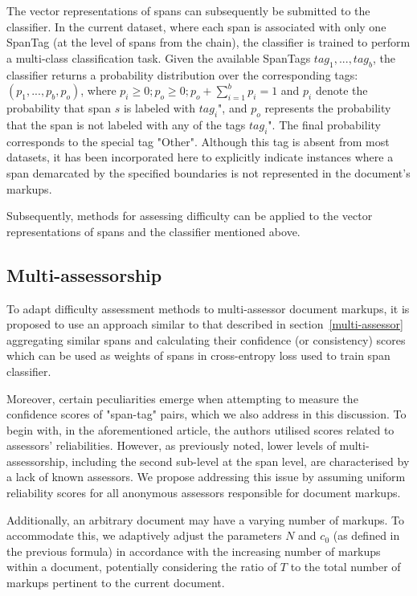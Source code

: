 \documentclass{article}
\begin{document}
The vector representations of spans can subsequently be submitted to the classifier. In the current dataset, where each span is associated with only one SpanTag (at the level of spans from the chain), the classifier is trained to perform a multi-class classification task. Given the available SpanTags $tag_1, ..., tag_b$, the classifier returns a probability distribution over the corresponding tags: $(p_1, ..., p_b, p_{o})$, where $p_i \geq 0; p_o \geq 0; p_o + \sum_{i=1}^bp_i = 1$ and $p_i$ denote the probability that span $s$ is labeled with $tag_i$", and $p_o$ represents the probability that the span is not labeled with any of the tags $tag_i$". The final probability corresponds to the special tag "Other". Although this tag is absent from most datasets, it has been incorporated here to explicitly indicate instances where a span demarcated by the specified boundaries is not represented in the document's markups.

Subsequently, methods for assessing difficulty can be applied to the vector representations of spans and the classifier mentioned above.

\subsection{Multi-assessorship}
To adapt difficulty assessment methods to multi-assessor document markups, it is proposed to use an approach similar to that described in section~\ref{multi-assessor} aggregating similar spans and calculating their confidence (or consistency) scores which can be used as weights of spans in cross-entropy loss used to train span classifier. 

Moreover, certain peculiarities emerge when attempting to measure the confidence scores of "span-tag" pairs, which we also address in this discussion. To begin with, in the aforementioned article, the authors utilised scores related to assessors’ reliabilities. However, as previously noted, lower levels of multi-assessorship, including the second sub-level at the span level, are characterised by a lack of known assessors. We propose addressing this issue by assuming uniform reliability scores for all anonymous assessors responsible for document markups.

Additionally, an arbitrary document may have a varying number of markups. To accommodate this, we adaptively adjust the parameters \(N\) and \(c_0\) (as defined in the previous formula) in accordance with the increasing number of markups within a document, potentially considering the ratio of \(T\) to the total number of markups pertinent to the current document.
\end{document}
